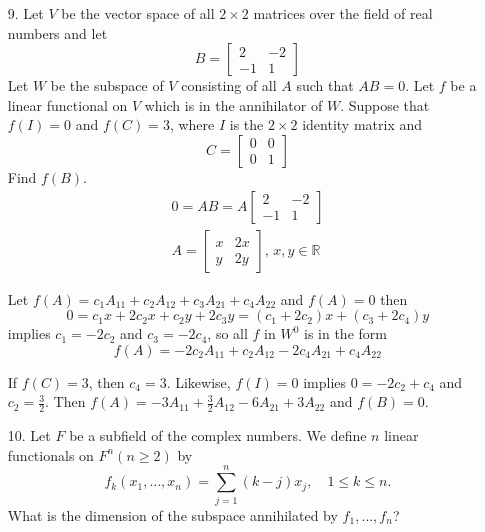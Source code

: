 \documentclass{article}
\begin{document}
\begin{enumerate}[listparindent=\parindent]
\item[9.] Let \(V\) be the vector space of all \(2 \times 2\) matrices over the field of real numbers and let
    \[ B = \begin{bmatrix} 2 & -2 \\ -1 & 1 \end{bmatrix} \]
    Let \(W\) be the subspace of \(V\) consisting of all \(A\) such that \(AB = 0\).
    Let \(f\) be a linear functional on \(V\) which is in the annihilator of \(W\).
    Suppose that \(f(I) = 0\) and \(f(C) = 3\), where \(I\) is the \(2 \times 2\) identity matrix and
    \[ C = \begin{bmatrix} 0 & 0 \\ 0 & 1 \end{bmatrix} \]
    Find \(f(B)\).
    \begin{gather*}
        0 = AB = A\begin{bmatrix} 2 & -2 \\ -1 & 1 \end{bmatrix} \\
        A = \begin{bmatrix} x & 2x \\ y & 2y \end{bmatrix},\, x, y \in \mathbb{R}
    \end{gather*}

    Let \(f(A) = c_1A_{11} + c_2A_{12} + c_3A_{21} + c_4A_{22}\) and \(f(A) = 0\) then
    \[ 0 = c_1x + 2c_2x + c_2y+ 2c_3y = (c_1 + 2c_2)x + (c_3 + 2c_4)y \]
    implies \(c_1 = -2c_2\) and \(c_3 = -2c_4\), so all \(f\) in \(W^0\) is in the form
    \[ f(A) = -2c_2A_{11} + c_2A_{12} - 2c_4A_{21} + c_4A_{22} \]

    If \(f(C) = 3\), then \(c_4 = 3\).
    Likewise, \(f(I) = 0\) implies \(0 = -2c_2 + c_4\) and \(c_2 = \frac{3}{2}\).
    Then \(f(A) = -3A_{11} + \frac{3}{2}A_{12} - 6A_{21} + 3A_{22}\) and \(f(B) = 0\).

\item[10.] Let \(F\) be a subfield of the complex numbers. We define \(n\) linear functionals on \(F^n (n \geq 2)\) by
    \[ f_k(x_1, \dots, x_n) = \sum_{j=1}^n (k - j)x_j ,\quad 1 \leq k \leq n. \]
    What is the dimension of the subspace annihilated by \(f_1, \dots, f_n\)?


\end{enumerate}
\end{document}
